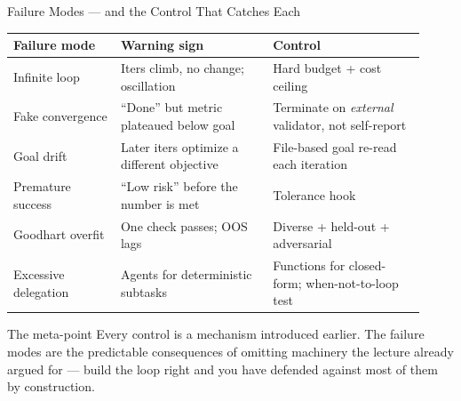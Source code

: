 \documentclass[9pt,t]{beamer}
\begin{document}
\begin{frame}{Failure Modes --- and the Control That Catches Each}

\begin{table}
\centering\small
\begin{tabular}{@{}p{0.24\linewidth}p{0.34\linewidth}p{0.34\linewidth}@{}}
\toprule
\textbf{Failure mode} & \textbf{Warning sign} & \textbf{Control} \\
\midrule
Infinite loop & Iters climb, no change; oscillation & Hard budget + cost ceiling \\
\addlinespace
Fake convergence & ``Done'' but metric plateaued below goal & Terminate on
\emph{external} validator, not self-report \\
\addlinespace
Goal drift & Later iters optimize a different objective & File-based goal re-read
each iteration \\
\addlinespace
Premature success & ``Low risk'' before the number is met & Tolerance hook \\
\addlinespace
Goodhart overfit & One check passes; OOS lags & Diverse + held-out + adversarial \\
\addlinespace
Excessive delegation & Agents for deterministic subtasks & Functions for
closed-form; when-not-to-loop test \\
\bottomrule
\end{tabular}
\end{table}

\medskip
\begin{alertblock}{The meta-point}
Every control is a mechanism introduced earlier. \alert{The failure modes are the
predictable consequences of omitting machinery the lecture already argued for} ---
build the loop right and you have defended against most of them by construction.
\end{alertblock}
\end{frame}
\end{document}
